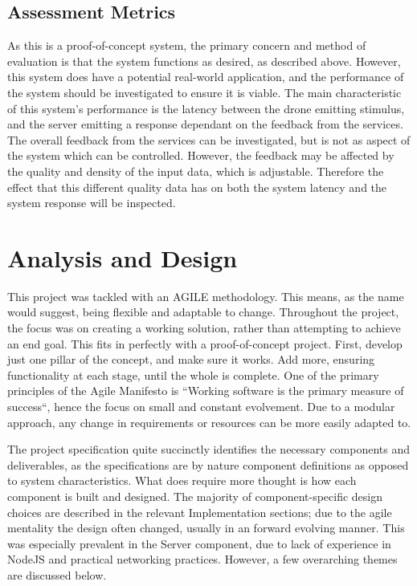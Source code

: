 \documentclass{article}
\begin{document}
\subsection{Assessment Metrics}
As this is a proof-of-concept system, the primary concern and method of evaluation is that the system functions as desired, as described above. However, this system does have a potential real-world application, and the performance of the system should be investigated to ensure it is viable. The main characteristic of this system's performance is the latency between the drone emitting stimulus, and the server emitting a response dependant on the feedback from the services. The overall feedback from the services can be investigated, but is not as aspect of the system which can be controlled. However, the feedback may be affected by the quality and density of the input data, which is adjustable. Therefore the effect that this different quality data has on both the system latency and the system response will be inspected.

\section{Analysis and Design}
This project was tackled with an AGILE methodology\cite{agileManifest}. This means, as the name would suggest, being flexible and adaptable to change. Throughout the project, the focus was on creating a working solution, rather than attempting to achieve an end goal. This fits in perfectly with a proof-of-concept project. First, develop just one pillar of the concept, and make sure it works. Add more, ensuring functionality at each stage, until the whole is complete. One of the primary principles of the Agile Manifesto is ``Working software is the primary measure of success``\cite{agileManifest}, hence the focus on small and constant evolvement. Due to a modular approach, any change in requirements or resources can be more easily adapted to. 

The project specification quite succinctly identifies the necessary components and deliverables, as the specifications are by nature component definitions as opposed to system characteristics. What does require more thought is how each component is built and designed. The majority of component-specific design choices are described in the relevant Implementation sections; due to the agile mentality the design often changed, usually in an forward evolving manner. This was especially prevalent in the Server component, due to lack of experience in NodeJS and practical networking practices. However, a few overarching themes are discussed below.
\end{document}

